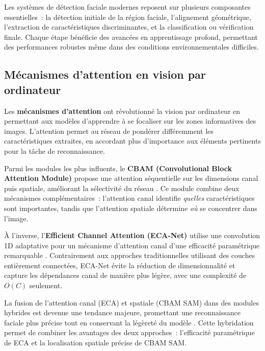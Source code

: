 \begin{onehalfspace}
\hspace{0.65 cm}Les systèmes de détection faciale modernes reposent sur plusieurs composantes essentielles~: la détection initiale de la région faciale, l'alignement géométrique, l'extraction de caractéristiques discriminantes, et la classification ou vérification finale. Chaque étape bénéficie des avancées en apprentissage profond, permettant des performances robustes même dans des conditions environnementales difficiles.

\subsection{Mécanismes d'attention en vision par ordinateur}

\hspace{0.65 cm}Les \textbf{mécanismes d'attention} ont révolutionné la vision par ordinateur en permettant aux modèles d'apprendre à se focaliser sur les zones informatives des images. L'attention permet au réseau de pondérer différemment les caractéristiques extraites, en accordant plus d'importance aux éléments pertinents pour la tâche de reconnaissance.

\hspace{0.65 cm}Parmi les modules les plus influents, le \textbf{CBAM (Convolutional Block Attention Module)} propose une attention séquentielle sur les dimensions canal puis spatiale, améliorant la sélectivité du réseau \cite{Woo2018CBAM}. Ce module combine deux mécanismes complémentaires~: l'attention canal identifie \textit{quelles} caractéristiques sont importantes, tandis que l'attention spatiale détermine \textit{où} se concentrer dans l'image.

\hspace{0.65 cm}À l'inverse, l'\textbf{Efficient Channel Attention (ECA-Net)} utilise une convolution 1D adaptative pour un mécanisme d'attention canal d'une efficacité paramétrique remarquable \cite{Wang2020ECANet}. Contrairement aux approches traditionnelles utilisant des couches entièrement connectées, ECA-Net évite la réduction de dimensionnalité et capture les dépendances canal de manière plus légère, avec une complexité de $O(C)$ seulement.

\hspace{0.65 cm}La fusion de l'attention canal (ECA) et spatiale (CBAM SAM) dans des modules hybrides est devenue une tendance majeure, promettant une reconnaissance faciale plus précise tout en conservant la légèreté du modèle \cite{Wang2024ECACBAM, Kim2025FeatherFace}. Cette hybridation permet de combiner les avantages des deux approches~: l'efficacité paramétrique de ECA et la localisation spatiale précise de CBAM SAM.


\end{onehalfspace}
